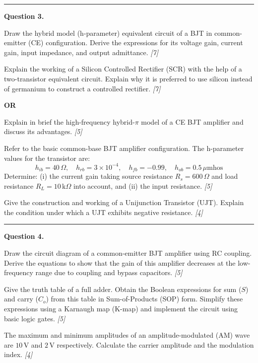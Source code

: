 \documentclass[11pt,a4paper]{article}
\newcommand{\pts}[1]{\hfill   \textit{[#1]}}
\begin{document}
\medskip\rule{\linewidth}{0.2pt}




\noindent   \textbf{Question 3.}

\begin{parts}
  \item Draw the hybrid model (h-parameter) equivalent circuit of a BJT in common-emitter (CE) configuration. Derive the expressions for its voltage gain, current gain, input impedance, and output admittance. \pts{7}
  \item Explain the working of a Silicon Controlled Rectifier (SCR) with the help of a two-transistor equivalent circuit. Explain why it is preferred to use silicon instead of germanium to construct a controlled rectifier. \pts{7}
\end{parts}
\hfill   \textbf{OR}

\begin{parts}
  \item Explain in brief the high-frequency hybrid-$\pi$ model of a CE BJT amplifier and discuss its advantages. \pts{5}
  \item Refer to the basic common-base BJT amplifier configuration. The h-parameter values for the transistor are:
    \[ h_{ib} = 40\,\Omega, \quad h_{rb} = 3  \times 10^{-4}, \quad h_{fb} = -0.99, \quad h_{ob} = 0.5\,\mu \text{mhos} \]
    Determine: (i) the current gain taking source resistance $R_s = 600\,\Omega$ and load resistance $R_L = 10\, \text{k}\Omega$ into account, and (ii) the input resistance. \pts{5}
  \item Give the construction and working of a Unijunction Transistor (UJT). Explain the condition under which a UJT exhibits negative resistance. \pts{4}
\end{parts}

\medskip\rule{\linewidth}{0.2pt}




\noindent   \textbf{Question 4.}

\begin{parts}
  \item Draw the circuit diagram of a common-emitter BJT amplifier using RC coupling. Derive the equations to show that the gain of this amplifier decreases at the low-frequency range due to coupling and bypass capacitors. \pts{5}
  \item Give the truth table of a full adder. Obtain the Boolean expressions for sum ($S$) and carry ($C_o$) from this table in Sum-of-Products (SOP) form. Simplify these expressions using a Karnaugh map (K-map) and implement the circuit using basic logic gates. \pts{5}
  \item The maximum and minimum amplitudes of an amplitude-modulated (AM) wave are $10\, \text{V}$ and $2\, \text{V}$ respectively. Calculate the carrier amplitude and the modulation index. \pts{4}
\end{parts}
\end{document}
